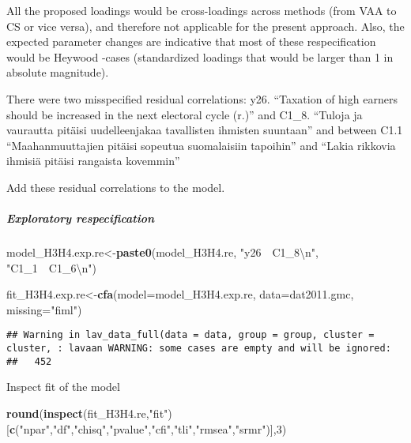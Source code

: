 \documentclass[
]{article}
\newenvironment{Shaded}{\begin{snugshade}}{\end{snugshade}}
\newcommand{\CharTok}[1]{\textcolor[rgb]{0.31,0.60,0.02}{#1}}
\newcommand{\DataTypeTok}[1]{\textcolor[rgb]{0.13,0.29,0.53}{#1}}
\newcommand{\DecValTok}[1]{\textcolor[rgb]{0.00,0.00,0.81}{#1}}
\newcommand{\KeywordTok}[1]{\textcolor[rgb]{0.13,0.29,0.53}{\textbf{#1}}}
\newcommand{\NormalTok}[1]{#1}
\newcommand{\StringTok}[1]{\textcolor[rgb]{0.31,0.60,0.02}{#1}}
\begin{document}
All the proposed loadings would be cross-loadings across methods (from
VAA to CS or vice versa), and therefore not applicable for the present
approach. Also, the expected parameter changes are indicative that most
of these respecification would be Heywood -cases (standardized loadings
that would be larger than 1 in absolute magnitude).

There were two misspecified residual correlations: y26. ``Taxation of
high earners should be increased in the next electoral cycle (r.)'' and
C1\_8. ``Tuloja ja vaurautta pitäisi uudelleenjakaa tavallisten ihmisten
suuntaan'' and between C1.1 ``Maahanmuuttajien pitäisi sopeutua
suomalaisiin tapoihin'' and ``Lakia rikkovia ihmisiä pitäisi rangaista
kovemmin''

Add these residual correlations to the model.

\hypertarget{exploratory-respecification-1}{%
\subparagraph{Exploratory
respecification}\label{exploratory-respecification-1}}

\begin{Shaded}
\begin{Highlighting}[]
\NormalTok{model_H3H4.exp.re<-}\KeywordTok{paste0}\NormalTok{(model_H3H4.re,}
                      \StringTok{"y26~~C1_8}\CharTok{\textbackslash{}n}\StringTok{"}\NormalTok{,}
                      \StringTok{"C1_1~~C1_6}\CharTok{\textbackslash{}n}\StringTok{"}\NormalTok{)}
\end{Highlighting}
\end{Shaded}

\begin{Shaded}
\begin{Highlighting}[]
\NormalTok{fit_H3H4.exp.re<-}\KeywordTok{cfa}\NormalTok{(}\DataTypeTok{model=}\NormalTok{model_H3H4.exp.re,}
              \DataTypeTok{data=}\NormalTok{dat2011.gmc,}
              \DataTypeTok{missing=}\StringTok{"fiml"}\NormalTok{)}
\end{Highlighting}
\end{Shaded}

\begin{verbatim}
## Warning in lav_data_full(data = data, group = group, cluster = cluster, : lavaan WARNING: some cases are empty and will be ignored:
##   452
\end{verbatim}

Inspect fit of the model

\begin{Shaded}
\begin{Highlighting}[]
\KeywordTok{round}\NormalTok{(}\KeywordTok{inspect}\NormalTok{(fit_H3H4.re,}\StringTok{"fit"}\NormalTok{)}
\NormalTok{      [}\KeywordTok{c}\NormalTok{(}\StringTok{"npar"}\NormalTok{,}\StringTok{"df"}\NormalTok{,}\StringTok{"chisq"}\NormalTok{,}\StringTok{"pvalue"}\NormalTok{,}\StringTok{"cfi"}\NormalTok{,}\StringTok{"tli"}\NormalTok{,}\StringTok{"rmsea"}\NormalTok{,}\StringTok{"srmr"}\NormalTok{)],}\DecValTok{3}\NormalTok{)}
\end{Highlighting}
\end{Shaded}
\end{document}
